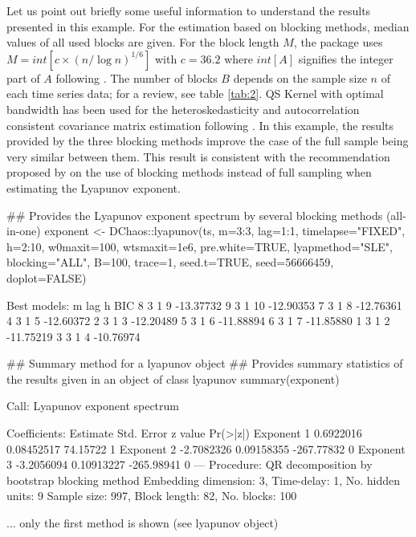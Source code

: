 Let us point out briefly some useful information to understand the results presented in this example. For the estimation based on blocking methods, median values of all used blocks are given. For the block length $M$, the  package uses $M=int \left[ c\times(n/\log n)^{1/6} \right]$ with $c=36.2$ where $int \left[ A \right]$ signifies the integer part of $A$ following \cite{Shintani2004}. The number of blocks $B$ depends on the sample size $n$ of each time series data; for a review, see table \ref{tab:2}. QS Kernel with optimal bandwidth has been used for the heteroskedasticity and autocorrelation consistent covariance matrix estimation following \cite{Andrews1991}. In this example, the results provided by the three blocking methods improve the case of the full sample being very similar between them. This result is consistent with the recommendation proposed by \cite{Shintani2004} on the use of blocking methods instead of full sampling when estimating the Lyapunov exponent.
\newpage
\begin{example}
## Provides the Lyapunov exponent spectrum by several blocking methods (all-in-one)
exponent <- DChaos::lyapunov(ts, m=3:3, lag=1:1, timelapse="FIXED", h=2:10, w0maxit=100, 
		     wtsmaxit=1e6, pre.white=TRUE, lyapmethod="SLE", blocking="ALL", 
		     B=100, trace=1, seed.t=TRUE, seed=56666459, doplot=FALSE)

 Best models: 
  m lag  h       BIC
8 3   1  9 -13.37732
9 3   1 10 -12.90353
7 3   1  8 -12.76361
4 3   1  5 -12.60372
2 3   1  3 -12.20489
5 3   1  6 -11.88894
6 3   1  7 -11.85880
1 3   1  2 -11.75219
3 3   1  4 -10.76974

## Summary method for a lyapunov object
## Provides summary statistics of the results given in an object of class lyapunov
summary(exponent)

Call:
Lyapunov exponent spectrum 

Coefficients:
             Estimate Std. Error    z value Pr(>|z|)
Exponent 1  0.6922016 0.08452517   74.15722        1
Exponent 2 -2.7082326 0.09158355 -267.77832        0
Exponent 3 -3.2056094 0.10913227 -265.98941        0
---
Procedure: QR decomposition by bootstrap blocking method 
Embedding dimension: 3, Time-delay: 1, No. hidden units: 9
Sample size: 997, Block length: 82, No. blocks: 100

... only the first method is shown (see lyapunov object)
\end{example}
 

